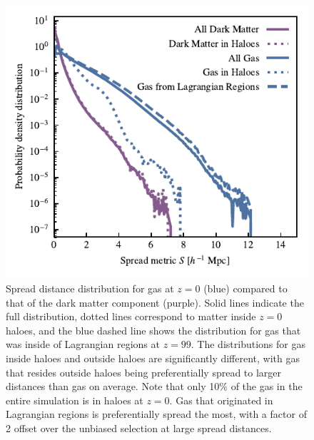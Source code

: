 \documentclass[fleqn,usenatbib]{mnras}
\begin{document}
\begin{figure}
    \centering
    \includegraphics{figures/s50j7kAHF/distance_plot_split_by_component+AHF_updated.pdf}
    \vspace{-0.7cm}
    \caption{Spread distance distribution for gas at $z=0$ (blue) compared to
    that of the dark matter component (purple). Solid lines indicate the full
    distribution, dotted lines correspond to matter inside $z=0$ haloes, and
    the blue dashed line shows the distribution for gas that was inside of
    Lagrangian regions at $z=99$. The distributions for gas inside haloes and
    outside haloes are significantly different, with gas that resides outside
    haloes being preferentially spread to larger distances than gas on
    average. Note that only 10\% of the gas in the entire simulation is in
    haloes at $z=0$. Gas that originated in Lagrangian regions is
    preferentially spread the most, with a factor of 2 offset over the
    unbiased selection at large spread distances.}
    \label{fig:distbaryon}
\end{figure}
\end{document}
